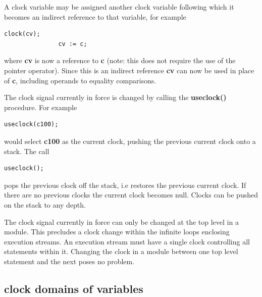             A clock variable may be assigned another clock variable following
            which it becomes an indirect reference to that variable, for example
            \begin{lstlisting}[gobble=12, language=threepl]
               clock(cv);
               cv := c;
            \end{lstlisting}
            where {\bf cv} is now a reference to {\bf c} (note: this does not
            require the use of the pointer operator). Since this is an indirect
            reference {\bf cv} can now be used in place of {\bf c}, including
            operands to equality comparisons.           
            
            The clock signal currently in force is changed by calling the
            {\bf useclock()} procedure. For example
            \begin{lstlisting}[gobble=12, language=threepl]
               useclock(c100);
            \end{lstlisting}
            would select {\bf c100} as the current clock, pushing the
            previous current clock onto a stack. The call
            \begin{lstlisting}[gobble=12, language=threepl]
               useclock();
            \end{lstlisting}
            pops the previous clock off the stack, i.e restores the previous
            current clock. If there are no previous clocks the current
            clock becomes null. Clocks can be pushed on the stack to any depth.
            
            The clock signal currently in force can only be changed at the
            top level in a module. This precludes a clock change within the
            infinite loops enclosing execution streams. An execution stream
            must have a single clock controlling all statements within it.
            Changing the clock in a module between one top level statement
            and the next poses no problem.
        
        \subsection{clock domains of variables}\label{subsec:clockdoms}


